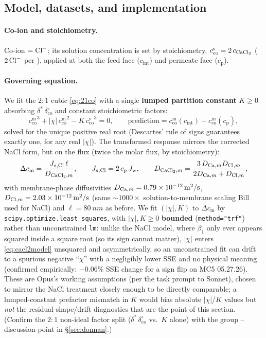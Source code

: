 \documentclass[11pt]{article}
\newcommand{\note}[1]{{\color{blue}\textsf{(#1)}}}
\newcommand{\cm}[1]{{c^{\mathrm{m}}_{#1}}}
\newcommand{\cs}[1]{{c^{\mathrm{s}}_{#1}}}
\newcommand{\co}{\mathrm{co}}
\newcommand{\Jw}{J_{\mathrm{w}}}
\newcommand{\dstar}{\delta^{*}}
\newcommand{\cint}{c_{\mathrm{int}}}
\newcommand{\cp}{c_{\mathrm{p}}}
\begin{document}
\subsection{Model, datasets, and implementation}\label{sec:cacl2impl}
\paragraph{Co-ion and stoichiometry.} Co-ion $=\ce{Cl-}$; its solution
concentration is set by stoichiometry, $\cs{\co}=2\,c_{\ce{CaCl2}}$ ($2\,\ce{Cl-}$
per ), applied at both the feed face ($\cint$) and permeate face
($\cp$).

\paragraph{Governing equation.} We fit the $2{:}1$ cubic \eqref{eq:21co} with a
single \textbf{lumped partition constant} $K\ge0$ absorbing $\dstar\,
\delta^{\circ}_{\co}$ and constant stoichiometric factors:
\begin{equation}
  \cm{\co}^3 + |\chi|\,\cm{\co}^2 - K\,\cs{\co}^3 = 0,
  \qquad \text{prediction} = \cm{\co}(\cint) - \cm{\co}(\cp),
  \label{eq:cacl2model}
\end{equation}
solved for the unique positive real root (Descartes' rule of signs guarantees
exactly one, for any real $|\chi|$). The transformed response mirrors the
corrected NaCl form, but on the  flux (twice the  molar flux,
by stoichiometry):
\begin{equation}
  \Delta c_{\mathrm m} = \frac{J_{s,\ce{Cl}}\,\ell}{D_{\ce{CaCl2},m}},
  \qquad J_{s,\ce{Cl}} = 2\,\cp\,\Jw,
  \qquad D_{\ce{CaCl2},m}=\frac{3\,D_{\ce{Ca},m} D_{\ce{Cl},m}}{2D_{\ce{Ca},m}+D_{\ce{Cl},m}},
  \label{eq:cacl2response}
\end{equation}
with membrane-phase diffusivities $D_{\ce{Ca},m}=\SI{0.79e-12}{m^2/s}$,
$D_{\ce{Cl},m}=\SI{2.03e-12}{m^2/s}$ (same $\sim\!1000\times$ solution-to-membrane
scaling Bill used for NaCl) and $\ell=\SI{80}{nm}$ as before. We fit $(|\chi|,K)$
to $\Delta c_{\mathrm m}$ by \texttt{scipy.optimize.least\_squares}, with
$|\chi|,K\ge0$ \textbf{bounded} (\texttt{method="trf"}) rather than
unconstrained \texttt{lm}: unlike the NaCl model, where $\beta_1$ only ever
appears squared inside a square root (so its sign cannot matter), $|\chi|$
enters \eqref{eq:cacl2model} unsquared and asymmetrically, so an unconstrained
fit can drift to a spurious negative ``$\chi$'' with a negligibly lower SSE and
no physical meaning (confirmed empirically: $-0.06\%$ SSE change for a sign
flip on MC5 05.27.26). These are Opus's working assumptions (per the task
prompt to Sonnet), chosen to mirror the NaCl treatment closely enough to be
directly comparable; a lumped-constant prefactor mismatch in $K$ would bias
absolute $|\chi|$/$K$ values but \emph{not} the residual-shape/drift
diagnostics that are the point of this section. \note{Confirm the $2{:}1$
non-ideal factor split ($\dstar\,\delta^{\circ}_{\co}$ vs.\ $K$ alone) with the
group -- discussion point in \S\ref{sec:donnan}.}
\end{document}
